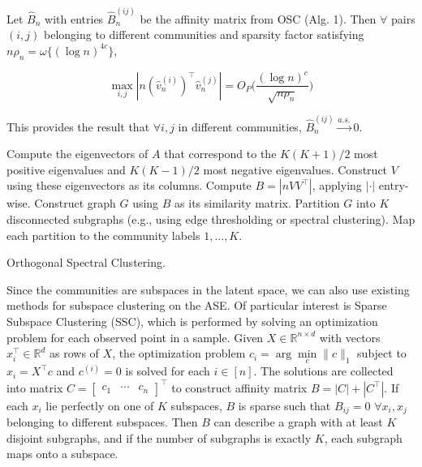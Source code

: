 \documentclass[
  11pt,
]{article}
\begin{document}
\begin{theorem}
\label{theorem4} 
Let $\hat{B}_n$ with entries $\hat{B}_n^{(ij)}$ be the affinity matrix from OSC 
(Alg. 1). Then $\forall$ pairs $(i, j)$ belonging to different communities 
and sparsity factor satisfying $n \rho_n = \omega\{(\log n)^{4c}\}$, 

\begin{equation} \label{eq:thm4}
\max_{i, j} |n (\hat{v}_n^{(i)})^\top \hat{v}_n^{(j)}| = 
O_P \Big( \frac{(\log n)^c}{\sqrt{n \rho_n}} \Big)
\end{equation}

This provides the result that $\forall i, j$ in different communities, 
$\hat{B}_n^{(ij)} \stackrel{a.s.}{\to} 0$.
\end{theorem}

\begin{algorithm}[t]
  \DontPrintSemicolon
  \SetAlgoLined
    Compute the eigenvectors of $A$ that correspond to the $K (K+1) / 2$ most 
    positive eigenvalues and $K (K-1) / 2$ most negative eigenvalues. Construct 
    $V$ using these eigenvectors as its columns.\;
    Compute $B = |n V V^\top|$, applying $|\cdot|$ entry-wise.\;
    Construct graph $G$ using $B$ as its similarity matrix.\;
    Partition $G$ into $K$ disconnected subgraphs  
    (e.g., using edge thresholding or spectral clustering).\;
    Map each partition to the community labels $1, ..., K$.\;
  \caption{Orthogonal Spectral Clustering.}
\end{algorithm}

Since the communities are subspaces in the latent space, we can also use
existing methods for subspace clustering on the ASE. Of particular
interest is Sparse Subspace Clustering (SSC), which is performed by
solving an optimization problem for each observed point in a sample.
Given \(X \in \mathbb{R}^{n \times d}\) with vectors
\(x_i^\top \in \mathbb{R}^d\) as rows of \(X\), the optimization problem
\(c_i = \arg\min\limits_{c} \|c\|_1\) subject to \(x_i = X^\top c\) and
\(c^{(i)} = 0\) is solved for each \(i \in [n]\). The solutions are
collected into matrix
\(C = \begin{bmatrix} c_1 & \cdots & c_n \end{bmatrix}^\top\) to
construct affinity matrix \(B = |C| + |C^\top|\). If each \(x_i\) lie
perfectly on one of \(K\) subspaces, \(B\) is sparse such that
\(B_{ij} = 0\) \(\forall x_i, x_j\) belonging to different subspaces.
Then \(B\) can describe a graph with at least \(K\) disjoint subgraphs,
and if the number of subgraphs is exactly \(K\), each subgraph maps onto
a subspace.
\end{document}
